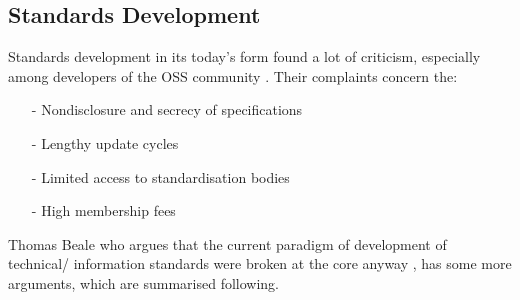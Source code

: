 %
%
%
%
%
%
%

\subsection{Standards Development}
\label{standards_development_heading}

Standards development in its today's form found a lot of criticism, especially
among developers of the OSS community \cite{openehrtechnical}. Their complaints
concern the:

\begin{itemize}
    \item[-] Nondisclosure and secrecy of specifications
    \item[-] Lengthy update cycles
    \item[-] Limited access to standardisation bodies
    \item[-] High membership fees
\end{itemize}

Thomas Beale who argues that the current paradigm of development of technical/
information standards were broken at the core anyway \cite{openehrtechnical},
has some more arguments, which are summarised following.





